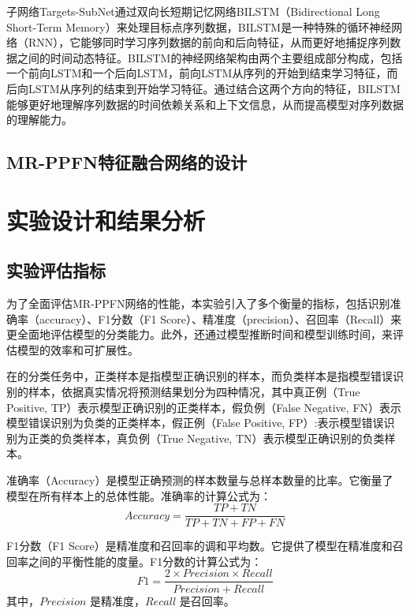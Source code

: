 子网络Targets-SubNet通过双向长短期记忆网络BILSTM（Bidirectional Long Short-Term Memory）来处理目标点序列数据，BILSTM是一种特殊的循环神经网络（RNN），它能够同时学习序列数据的前向和后向特征，从而更好地捕捉序列数据之间的时间动态特征。BILSTM的神经网络架构由两个主要组成部分构成，包括一个前向LSTM和一个后向LSTM，前向LSTM从序列的开始到结束学习特征，而后向LSTM从序列的结束到开始学习特征。通过结合这两个方向的特征，BILSTM能够更好地理解序列数据的时间依赖关系和上下文信息，从而提高模型对序列数据的理解能力。

\subsection{MR-PPFN特征融合网络的设计}




\section{实验设计和结果分析}
\subsection{实验评估指标}
为了全面评估MR-PPFN网络的性能，本实验引入了多个衡量的指标，包括识别准确率（accuracy）、F1分数（F1 Score）、精准度（precision）、召回率（Recall）来更全面地评估模型的分类能力。此外，还通过模型推断时间和模型训练时间，来评估模型的效率和可扩展性。

在的分类任务中，正类样本是指模型正确识别的样本，而负类样本是指模型错误识别的样本，依据真实情况将预测结果划分为四种情况，其中真正例（True Positive, TP）表示模型正确识别的正类样本，假负例（False Negative, FN）表示模型错误识别为负类的正类样本，假正例（False Positive, FP）:表示模型错误识别为正类的负类样本，真负例（True Negative, TN）表示模型正确识别的负类样本。

准确率（Accuracy）是模型正确预测的样本数量与总样本数量的比率。它衡量了模型在所有样本上的总体性能。准确率的计算公式为：
\begin{equation}
    \label{eq:accuracy}
    Accuracy = \frac{TP + TN}{TP + TN + FP + FN}
\end{equation}

F1分数（F1 Score）是精准度和召回率的调和平均数。它提供了模型在精准度和召回率之间的平衡性能的度量。F1分数的计算公式为：
\begin{equation}
    \label{eq:f1}
    F1 = \frac{2 \times Precision \times Recall}{Precision + Recall}
\end{equation}
其中，$Precision$ 是精准度，$Recall$ 是召回率。

